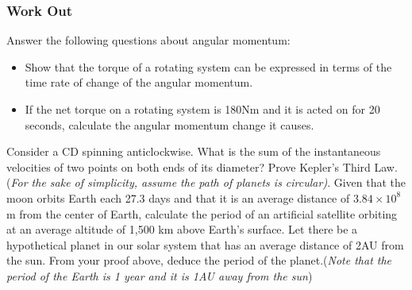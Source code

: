 \documentclass[13pt,addpoints]{exam}
\begin{document}
{{{\begin{questions}
					\subsubsection*{Work Out}
					\question Answer the following questions about angular momentum:
					\begin{itemize}
						\item Show that the torque of a rotating system can be expressed in terms of the time rate of change of the angular momentum.\vspace{0.5in}
						\item If the net torque on a rotating system is 180Nm and it is acted on for 20 seconds, calculate the angular momentum change it causes.\vspace{0.5in}
					\end{itemize}
					\question Consider a CD spinning anticlockwise. What is the sum of the instantaneous velocities of two points on both ends of its diameter?\vspace{0.5in}
					\question Prove Kepler's Third Law.(\textit{For the sake of simplicity, assume the path of planets is circular)}.\vspace{0.9in}
					\question Given that the moon orbits Earth each 27.3 days and that it is an average distance of $3.84\times10^{8}$m from the center of Earth, calculate the period of an artificial satellite orbiting at an average altitude of 1,500 km above Earth’s surface.\vspace{1in}
					\question Let there be a hypothetical planet in our solar system that has an average distance of 2AU from the sun. From your proof above, deduce the period of the planet.(\textit{Note that the period of the Earth is 1 year and it is 1AU away from the sun})\vspace{1in}
				\end{questions}
				\begin{center}

\end{center}}}}
\end{document}
